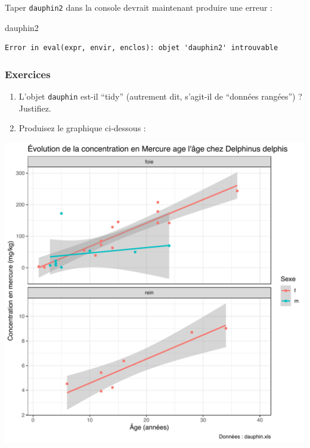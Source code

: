 \documentclass[a4paperpaper,]{article}
\newenvironment{Shaded}{\begin{snugshade}}{\end{snugshade}}
\newcommand{\NormalTok}[1]{\textcolor[rgb]{0.12,0.11,0.11}{#1}}
\providecommand{\tightlist}{%
  \setlength{\itemsep}{0pt}\setlength{\parskip}{0pt}}
\begin{document}
Taper \texttt{dauphin2} dans la console devrait maintenant produire une erreur :

\begin{Shaded}
\begin{Highlighting}[]
\NormalTok{dauphin2}
\end{Highlighting}
\end{Shaded}

\begin{verbatim}
Error in eval(expr, envir, enclos): objet 'dauphin2' introuvable
\end{verbatim}

\hypertarget{exercices-8}{%
\subsubsection{Exercices}\label{exercices-8}}

\begin{enumerate}
\def\labelenumi{\arabic{enumi}.}
\tightlist
\item
  L'objet \texttt{dauphin} est-il ``tidy'' (autrement dit, s'agit-il de ``données rangées'') ? Justifiez.
\item
  Produisez le graphique ci-dessous :
\end{enumerate}

\begin{center}\includegraphics[width=0.9\linewidth]{figure/exercicedauphin-1} \end{center}
\end{document}

